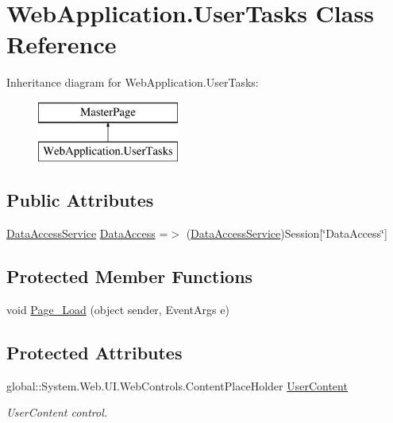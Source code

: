 \hypertarget{classWebApplication_1_1UserTasks}{}\section{Web\+Application.\+User\+Tasks Class Reference}
\label{classWebApplication_1_1UserTasks}
Inheritance diagram for Web\+Application.\+User\+Tasks\+:\begin{figure}[H]
\begin{center}
\leavevmode
\includegraphics[height=2.000000cm]{d3/d4e/classWebApplication_1_1UserTasks}
\end{center}
\end{figure}
\subsection*{Public Attributes}
\begin{DoxyCompactItemize}
\item 
\mbox{\hyperlink{classDataBaseAccess_1_1DataAccessService}{Data\+Access\+Service}} \mbox{\hyperlink{classWebApplication_1_1UserTasks_a80618e70f1a8743f5da5880445ac7e67}{Data\+Access}} =$>$ (\mbox{\hyperlink{classDataBaseAccess_1_1DataAccessService}{Data\+Access\+Service}})Session\mbox{[}\char`\"{}Data\+Access\char`\"{}\mbox{]}
\end{DoxyCompactItemize}
\subsection*{Protected Member Functions}
\begin{DoxyCompactItemize}
\item 
void \mbox{\hyperlink{classWebApplication_1_1UserTasks_a741bea9ced0083590cfa88d43b5441df}{Page\+\_\+\+Load}} (object sender, Event\+Args e)
\end{DoxyCompactItemize}
\subsection*{Protected Attributes}
\begin{DoxyCompactItemize}
\item 
global\+::\+System.\+Web.\+U\+I.\+Web\+Controls.\+Content\+Place\+Holder \mbox{\hyperlink{classWebApplication_1_1UserTasks_aa929c7e9c76317af65221bfb4ead895d}{User\+Content}}
\begin{DoxyCompactList}\small\item\em User\+Content control. \end{DoxyCompactList}\end{DoxyCompactItemize}

